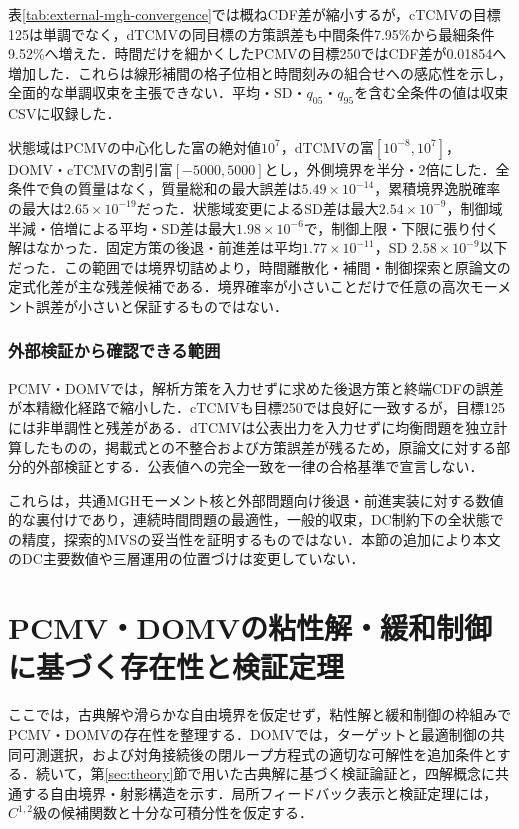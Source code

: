 \documentclass[10pt,a4paper]{article}
\theoremstyle{plain}
\theoremstyle{definition}
\begin{document}
表\ref{tab:external-mgh-convergence}では概ねCDF差が縮小するが，cTCMVの目標125は単調でなく，dTCMVの同目標の方策誤差も中間条件7.95\%から最細条件9.52\%へ増えた．時間だけを細かくしたPCMVの目標250ではCDF差が0.01854へ増加した．これらは線形補間の格子位相と時間刻みの組合せへの感応性を示し，全面的な単調収束を主張できない．平均・SD・$q_{05}$・$q_{95}$を含む全条件の値は収束CSVに収録した．

状態域はPCMVの中心化した富の絶対値$10^7$，dTCMVの富$[10^{-8},10^7]$，DOMV・cTCMVの割引富$[-5000,5000]$とし，外側境界を半分・2倍にした．全条件で負の質量はなく，質量総和の最大誤差は$5.49\times10^{-14}$，累積境界逸脱確率の最大は$2.65\times10^{-19}$だった．状態域変更によるSD差は最大$2.54\times10^{-9}$，制御域半減・倍増による平均・SD差は最大$1.98\times10^{-6}$で，制御上限・下限に張り付く解はなかった．固定方策の後退・前進差は平均$1.77\times10^{-11}$，SD $2.58\times10^{-9}$以下だった．この範囲では境界切詰めより，時間離散化・補間・制御探索と原論文の定式化差が主な残差候補である．境界確率が小さいことだけで任意の高次モーメント誤差が小さいと保証するものではない．

\subsubsection{外部検証から確認できる範囲}

PCMV・DOMVでは，解析方策を入力せずに求めた後退方策と終端CDFの誤差が本精緻化経路で縮小した．cTCMVも目標250では良好に一致するが，目標125には非単調性と残差がある．dTCMVは公表出力を入力せずに均衡問題を独立計算したものの，掲載式との不整合および方策誤差が残るため，原論文に対する部分的外部検証とする．公表値への完全一致を一律の合格基準で宣言しない．

これらは，共通MGHモーメント核と外部問題向け後退・前進実装に対する数値的な裏付けであり，連続時間問題の最適性，一般的収束，DC制約下の全状態での精度，探索的MVSの妥当性を証明するものではない．本節の追加により本文のDC主要数値や三層運用の位置づけは変更していない．

\section{PCMV・DOMVの粘性解・緩和制御に基づく存在性と検証定理}
\label{app:technical-proofs}
ここでは，古典解や滑らかな自由境界を仮定せず，粘性解と緩和制御の枠組みでPCMV・DOMVの存在性を整理する．DOMVでは，ターゲットと最適制御の共同可測選択，および対角接続後の閉ループ方程式の適切な可解性を追加条件とする．続いて，第\ref{sec:theory}節で用いた古典解に基づく検証論証と，四解概念に共通する自由境界・射影構造を示す．局所フィードバック表示と検証定理には，$C^{1,2}$級の候補関数と十分な可積分性を仮定する．
\end{document}
